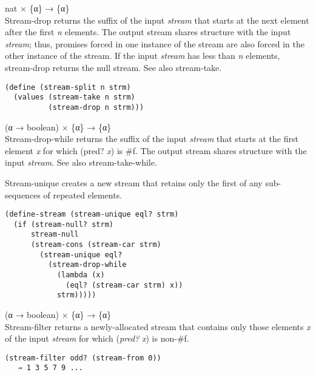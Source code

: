\begin{entry}{%
  }

  nat × \{α\} → \{α\}\\
  Stream-drop returns the suffix of the input \emph{stream} that
  starts at the next element after the first \emph{n} elements. The
  output stream shares structure with the input \emph{stream}; thus,
  promises forced in one instance of the stream are also forced in the
  other instance of the stream. If the input \emph{stream} has less
  than \emph{n} elements, stream-drop returns the null stream. See
  also stream-take.

\begin{verbatim}
(define (stream-split n strm)
  (values (stream-take n strm)
          (stream-drop n strm)))
\end{verbatim}
\end{entry}

\begin{entry}{%
  }

  (α → boolean) × \{α\} → \{α\}\\
  Stream-drop-while returns the suffix of the input \emph{stream} that
  starts at the first element \emph{x} for which (pred? \emph{x}) is
  \#f.  The output stream shares structure with the input
  \emph{stream}. See also stream-take-while.

  Stream-unique creates a new stream that retains only the first of
  any sub-sequences of repeated elements.

\begin{verbatim}
(define-stream (stream-unique eql? strm)
  (if (stream-null? strm)
      stream-null
      (stream-cons (stream-car strm)
        (stream-unique eql?
          (stream-drop-while
            (lambda (x)
              (eql? (stream-car strm) x))
            strm)))))
\end{verbatim}
\end{entry}

\begin{entry}{%
  }

  (α → boolean) × \{α\} → \{α\}\\
  Stream-filter returns a newly-allocated stream that contains only
  those elements \emph{x} of the input \emph{stream} for which
  (\emph{pred?}  \emph{x}) is non-\#f.

\begin{verbatim}
(stream-filter odd? (stream-from 0))
   ⇒ 1 3 5 7 9 ...
\end{verbatim}
\end{entry}

